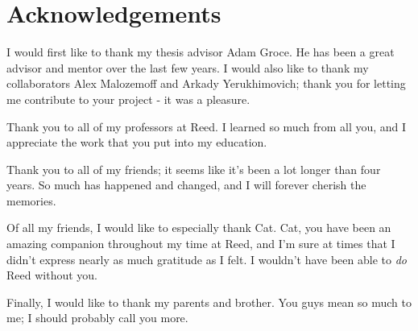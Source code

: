 

\chapter*{Acknowledgements}
I would first like to thank my thesis advisor Adam Groce. 
He has been a great advisor and mentor over the last few years.
I would also like to thank my collaborators Alex Malozemoff and Arkady Yerukhimovich; thank you for letting me contribute to your project - it was a pleasure.

Thank you to all of my professors at Reed. 
I learned so much from all you, and I appreciate the work that you put into my education.

Thank you to all of my friends; it seems like it's been a lot longer than four years.
So much has happened and changed, and I will forever cherish the memories.

Of all my friends, I would like to especially thank Cat. 
Cat, you have been an amazing companion throughout my time at Reed, and I'm sure at times that I didn't express nearly as much gratitude as I felt. 
I wouldn't have been able to \textit{do} Reed without you. 

Finally, I would like to thank my parents and brother.
You guys mean so much to me; I should probably call you more. 


